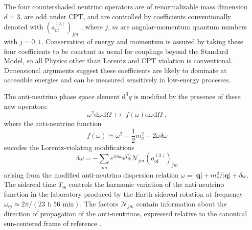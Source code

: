 The four countershaded neutrino operators are of renormalizable mass dimension $d = 3$, are odd under CPT, and are controlled by coefficients conventionally denoted with $(a^{(3)}_\text{of})_{jm}$ , where $j$, $m$ are angular-momentum quantum numbers with $j = 0,1$. Conservation of energy and momentum is assured by taking these four coefficients to be constant as usual for couplings beyond the Standard Model, so all Physics other than Lorentz and CPT violation is conventional. Dimensional arguments suggest these coefficients are likely to dominate at accessible energies and can be measured sensitively in low-energy processes.

The anti-neutrino phase space element $\text{d}^3q$ is modified by the presence of these new operators:
\begin{equation}\omega^2\text{d}\omega\text{d}\Omega \;\longmapsto\; f(\omega)\text{d}\omega\text{d}\Omega\;,\end{equation}
where the anti-neutrino function
\begin{equation}f(\omega)\simeq\omega^2-\frac{1}{2}m_\nu^2-2\omega\delta\omega\end{equation}
encodes the Lorentz-violating modifications
\begin{equation}\delta\omega=-\sum_{jm}e^{im\omega_\oplus T_\oplus}\mathcal{N}_{jm}(a_\text{of}^{(3)})_{jm}\end{equation}
arising from the modified anti-neutrino dispersion relation \cite{SMEneutrinos} $\omega=|\mathbf{q}|+m_\nu^2/|\mathbf{q}|+\delta\omega$. The sidereal time $T_\oplus$ controls the harmonic variation of the anti-neutrino function in the laboratory produced by the Earth sidereal rotation at frequency $\omega_\oplus\simeq 2\pi/(23\text{ h } 56\text{ min})$. The factors $\mathcal{N}_{jm}$ contain information about the direction of propagation of the anti-neutrinos, expressed relative to the canonical sun-centered frame of reference \cite{frameor1,frameor2}.

